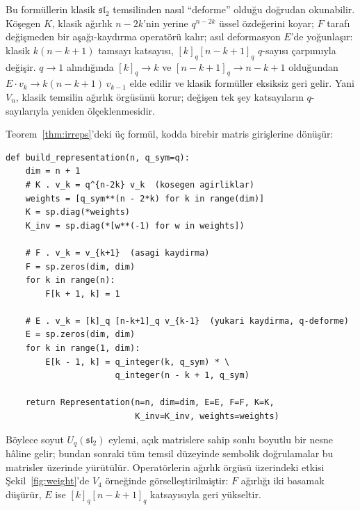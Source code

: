 \documentclass[12pt,a4paper,fleqn]{report}
\newcommand{\normalsemi}{;}
\newcommand{\normalsemi}{\begingroup\semicolonfont;\endgroup}
\numberwithin{equation}{chapter}
\theoremstyle{plain}
\theoremstyle{definition}
\renewcommand{\sl}{\mathfrak{sl}}
\newcommand{\Uq}{U_q(\sl_2)}
\newcommand{\qint}[1]{[#1]_q}
\begin{document}
Bu formüllerin klasik $\sl_2$ temsilinden nasıl ``deforme'' olduğu doğrudan
okunabilir. Köşegen $K$, klasik ağırlık $n-2k$'nin yerine $q^{n-2k}$ üssel
özdeğerini koyar\normalsemi{} $F$ tarafı değişmeden bir aşağı-kaydırma operatörü kalır\normalsemi{}
asıl deformasyon $E$'de yoğunlaşır: klasik $k(n-k+1)$ tamsayı katsayısı,
$\qint{k}\qint{n-k+1}$ $q$-sayısı çarpımıyla değişir. $q\to 1$ alındığında
$\qint{k}\to k$ ve $\qint{n-k+1}\to n-k+1$ olduğundan $E\cdot v_k \to
k(n-k+1)\,v_{k-1}$ elde edilir ve klasik formüller eksiksiz geri gelir. Yani
$V_n$, klasik temsilin ağırlık örgüsünü korur\normalsemi{} değişen tek şey katsayıların
$q$-sayılarıyla yeniden ölçeklenmesidir.

Teorem~\ref{thm:irreps}'deki üç formül, kodda birebir matris girişlerine
dönüşür:

\begin{lstlisting}[style=pyblock,caption={$V_n$ Temsilinde $E,F,K,K^{-1}$ Matrislerinin İnşası}]
def build_representation(n, q_sym=q):
    dim = n + 1
    # K . v_k = q^{n-2k} v_k  (kosegen agirliklar)
    weights = [q_sym**(n - 2*k) for k in range(dim)]
    K = sp.diag(*weights)
    K_inv = sp.diag(*[w**(-1) for w in weights])

    # F . v_k = v_{k+1}  (asagi kaydirma)
    F = sp.zeros(dim, dim)
    for k in range(n):
        F[k + 1, k] = 1

    # E . v_k = [k]_q [n-k+1]_q v_{k-1}  (yukari kaydirma, q-deforme)
    E = sp.zeros(dim, dim)
    for k in range(1, dim):
        E[k - 1, k] = q_integer(k, q_sym) * \
                      q_integer(n - k + 1, q_sym)

    return Representation(n=n, dim=dim, E=E, F=F, K=K,
                          K_inv=K_inv, weights=weights)
\end{lstlisting}

Böylece soyut $\Uq$ eylemi, açık matrislere sahip sonlu boyutlu bir nesne
hâline gelir\normalsemi{} bundan sonraki tüm temsil düzeyinde sembolik doğrulamalar bu
matrisler üzerinde yürütülür. Operatörlerin ağırlık örgüsü üzerindeki etkisi
Şekil~\ref{fig:weight}'de $V_4$ örneğinde görselleştirilmiştir: $F$ ağırlığı iki
basamak düşürür, $E$ ise $\qint{k}\qint{n-k+1}$ katsayısıyla geri yükseltir.
\end{document}
